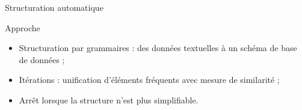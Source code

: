 \begin{frame}{Structuration automatique}
    \vfill

    \begin{block}{Approche}
        \begin{itemize}
            \item Structuration par grammaires : des données textuelles à un schéma de base de données ;
            \item Itérations : unification d'éléments fréquents avec mesure de similarité ;
            \item Arrêt lorsque la structure n'est plus simplifiable.%
        \end{itemize}
    \end{block}
\end{frame}

            

                

